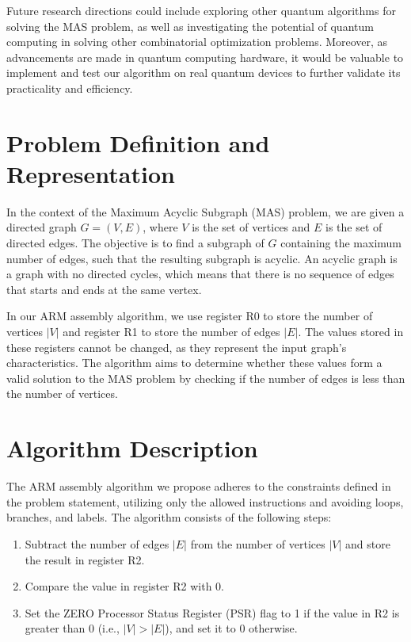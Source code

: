 Future research directions could include exploring other quantum algorithms for solving the MAS problem, as well as investigating the potential of quantum computing in solving other combinatorial optimization problems. Moreover, as advancements are made in quantum computing hardware, it would be valuable to implement and test our algorithm on real quantum devices to further validate its practicality and efficiency.



\section{Problem Definition and Representation}

In the context of the Maximum Acyclic Subgraph (MAS) problem, we are given a directed graph $G = (V, E)$, where $V$ is the set of vertices and $E$ is the set of directed edges. The objective is to find a subgraph of $G$ containing the maximum number of edges, such that the resulting subgraph is acyclic. An acyclic graph is a graph with no directed cycles, which means that there is no sequence of edges that starts and ends at the same vertex.

In our ARM assembly algorithm, we use register R0 to store the number of vertices $|V|$ and register R1 to store the number of edges $|E|$. The values stored in these registers cannot be changed, as they represent the input graph's characteristics. The algorithm aims to determine whether these values form a valid solution to the MAS problem by checking if the number of edges is less than the number of vertices.

\section{Algorithm Description}

The ARM assembly algorithm we propose adheres to the constraints defined in the problem statement, utilizing only the allowed instructions and avoiding loops, branches, and labels. The algorithm consists of the following steps:

\begin{enumerate}
    \item Subtract the number of edges $|E|$ from the number of vertices $|V|$ and store the result in register R2.
    \item Compare the value in register R2 with 0.
    \item Set the ZERO Processor Status Register (PSR) flag to 1 if the value in R2 is greater than 0 (i.e., $|V| > |E|$), and set it to 0 otherwise.
\end{enumerate}


